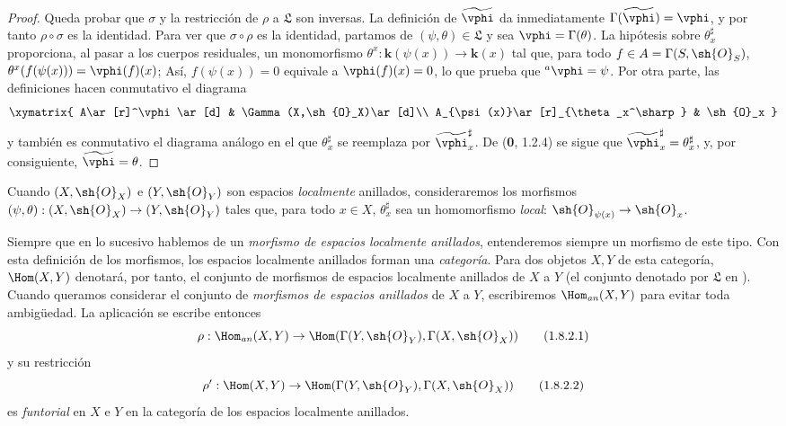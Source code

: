 \begin{proof}
Queda probar que $\sigma$ y la restricción de $\rho$ a $\mathfrak L$
son inversas. La definición de $\widetilde{\vphi}$ da inmediatamente
$\Gamma(\widetilde{\vphi})=\vphi$, y por tanto $\rho\circ\sigma$ es la
identidad. Para ver que $\sigma\circ\rho$ es la identidad, partamos de
$(\psi,\theta)\in\mathfrak L$ y sea $\vphi=\Gamma(\theta)$. La
hipótesis sobre $\theta_x^\sharp$ proporciona, al pasar a los cuerpos
residuales, un monomorfismo
$\theta^x:\boldsymbol{k}(\psi(x))\to\boldsymbol{k}(x)$
tal que, para todo $f\in A=\Gamma(S,\sh{O}_S)$,
$\theta^x(f(\psi(x)))=\vphi(f)(x)$;
Así, $f(\psi(x))=0$ equivale a $\vphi(f)(x)=0$, lo que prueba que
${}^a\vphi=\psi$. Por otra parte, las definiciones hacen conmutativo
el diagrama
\[
  \xymatrix{
    A\ar[r]^\vphi\ar[d] &
    \Gamma(X,\sh{O}_X)\ar[d]\\
    A_{\psi(x)}\ar[r]_{\theta_x^\sharp} &
    \sh{O}_x
  }
\]
y también es conmutativo el diagrama análogo en el que
$\theta_x^\sharp$ se reemplaza por $\widetilde{\vphi}_x^\sharp$. De
(\textbf 0, 1.2.4) se sigue que
$\widetilde{\vphi}_x^\sharp=\theta_x^\sharp$, y, por consiguiente,
$\widetilde{\vphi}=\theta$.
\end{proof}

\begin{env}[1.8.2]
\label{ega2:addendum:I.1.8.2-fr}
Cuando $(X,\sh{O}_X)$ e $(Y,\sh{O}_Y)$ son espacios \emph{localmente}
anillados, consideraremos los morfismos
$(\psi,\theta):(X,\sh{O}_X)\to(Y,\sh{O}_Y)$ tales que, para todo
$x\in X$, $\theta_x^\sharp$ sea un homomorfismo \emph{local}: $\sh{O}_{\psi(x)}\to\sh{O}_x$.

Siempre que en lo sucesivo hablemos de un
\emph{morfismo de espacios localmente anillados}, entenderemos siempre
un morfismo de este tipo. Con esta definición de los morfismos, los
espacios localmente anillados forman una \emph{categoría}. Para dos objetos
$X,Y$ de esta categoría, $\Hom(X,Y)$ denotará, por tanto, el conjunto
de morfismos de espacios localmente anillados de $X$ a $Y$ (el
conjunto denotado por $\mathfrak L$ en ). Cuando queramos
considerar el conjunto de \emph{morfismos de espacios anillados} de $X$ a
$Y$, escribiremos $\Hom_{\mathit{an}}(X,Y)$ para evitar toda
ambigüedad. La aplicación  se escribe entonces
\begin{equation}
\label{ega2:addendum:I.1.8.2.1-fr}
  \rho:\Hom_{\mathit{an}}(X,Y)
  \to\Hom(\Gamma(Y,\sh{O}_Y),\Gamma(X,\sh{O}_X))
\tag{1.8.2.1}
\end{equation}
y su restricción
\begin{equation}
\label{ega2:addendum:I.1.8.2.2-fr}
  \rho':\Hom(X,Y)
  \to\Hom(\Gamma(Y,\sh{O}_Y),\Gamma(X,\sh{O}_X))
\tag{1.8.2.2}
\end{equation}
es \emph{funtorial} en $X$ e $Y$ en la categoría de los espacios localmente
anillados.
\end{env}


